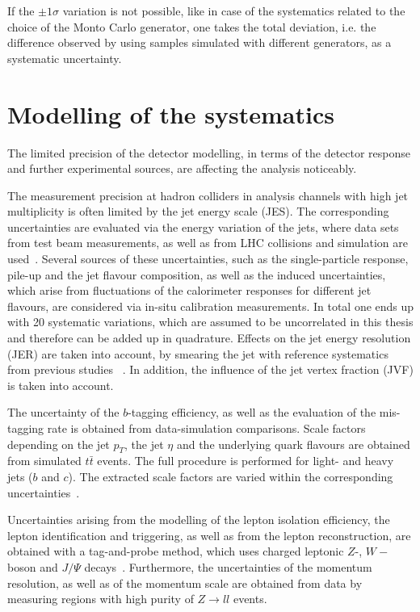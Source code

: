  If the $\pm 1 \sigma$ variation is not possible, like in case of the systematics related to the choice of the Monto Carlo generator, one takes the total deviation, i.e. the difference observed by using samples simulated with different generators, as a systematic uncertainty. 


	

\section{Modelling of the systematics}
The limited precision of the detector modelling, in terms of the detector response and further experimental sources, are affecting the analysis noticeably. 

 The measurement precision at hadron colliders in analysis channels with high jet multiplicity is often limited by the jet energy scale (JES). The corresponding uncertainties are evaluated via the energy variation of the jets, where
data sets from test beam measurements, as well as from LHC collisions and simulation are used~\cite{Aad:2011he, Aad:2012ag, Aad:2012vm,Aad:2014bia}. Several sources of these uncertainties, such as the single-particle response, pile-up and the jet flavour composition, as well as the induced uncertainties, which arise from fluctuations of the calorimeter responses for different jet flavours, 
 are considered via in-situ calibration measurements.  In total one ends up with 20 systematic variations, which are assumed to be uncorrelated in this thesis and therefore can be added up in quadrature. 
 Effects on the jet energy resolution (JER) are taken into account, by smearing the jet with reference systematics from previous studies ~\cite{ATL-PHYS-PUB-2015-015}.
 In addition, the influence of the  jet vertex fraction (JVF)  is taken into account.
 

 The uncertainty of the $b$-tagging efficiency, as well as the evaluation of the mis-tagging rate is obtained from data-simulation comparisons. Scale factors depending on the jet $p_T$, the jet $\eta$ and the underlying quark flavours are obtained from simulated $t\bar{t}$ events.  
The full procedure is performed  for  light- and heavy jets ($b$ and $c$). The extracted scale factors are varied within the corresponding uncertainties~\cite{ATLAS-CONF-2014-046, ATLAS-CONF-2014-004, ATL-PHYS-PUB-2015-022}.


 Uncertainties arising from the modelling of the lepton isolation efficiency, the lepton identification and triggering, as well as from the lepton reconstruction, are obtained with a tag-and-probe method, which uses charged leptonic  $Z$-, $W-$boson and $J/\Psi$ decays~\cite{ATLAS:2016iqc,ATL-PHYS-PUB-2016-015,Aad:2011mk,Aad:2016jkr}. Furthermore, the uncertainties of the  momentum resolution,  as well as of the momentum scale  are  obtained from data by measuring regions with high purity of  $Z \rightarrow ll$ events.

